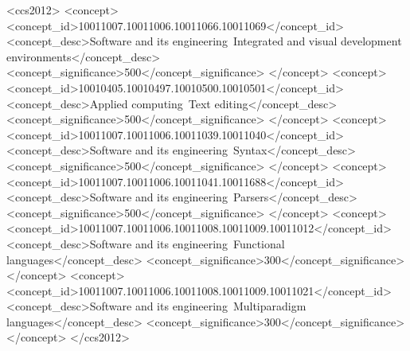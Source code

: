 \documentclass{sig-alternate-05-2015}
\def\inputtex#1{}
\begin{document}
\begin{CCSXML}
<ccs2012>
<concept>
<concept_id>10011007.10011006.10011066.10011069</concept_id>
<concept_desc>Software and its engineering~Integrated and visual development environments</concept_desc>
<concept_significance>500</concept_significance>
</concept>
<concept>
<concept_id>10010405.10010497.10010500.10010501</concept_id>
<concept_desc>Applied computing~Text editing</concept_desc>
<concept_significance>500</concept_significance>
</concept>
<concept>
<concept_id>10011007.10011006.10011039.10011040</concept_id>
<concept_desc>Software and its engineering~Syntax</concept_desc>
<concept_significance>500</concept_significance>
</concept>
<concept>
<concept_id>10011007.10011006.10011041.10011688</concept_id>
<concept_desc>Software and its engineering~Parsers</concept_desc>
<concept_significance>500</concept_significance>
</concept>
<concept>
<concept_id>10011007.10011006.10011008.10011009.10011012</concept_id>
<concept_desc>Software and its engineering~Functional languages</concept_desc>
<concept_significance>300</concept_significance>
</concept>
<concept>
<concept_id>10011007.10011006.10011008.10011009.10011021</concept_id>
<concept_desc>Software and its engineering~Multiparadigm languages</concept_desc>
<concept_significance>300</concept_significance>
</concept>
</ccs2012>

\end{CCSXML}

\printccsdesc

\keywords{\commonlisp{}}

\inputtex{sec-introduction.tex}
\inputtex{sec-previous.tex}
\inputtex{sec-our-method.tex}
\inputtex{sec-performance.tex}
\inputtex{sec-conclusions.tex}
\inputtex{sec-acknowledgements.tex}



\appendix
\inputtex{app-details.tex}
\end{document}
